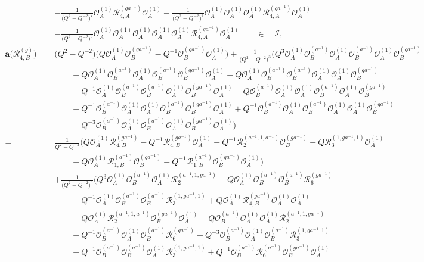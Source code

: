 \documentclass{amsart}
\newcommand{\Oa}{\mathcal O_A}
\newcommand{\Ob}{\mathcal O_B}
\newcommand{\R}{\mathcal R}
\begin{document}
\begin{align*}
=&-\frac1{\big(Q^2-Q^{-2}\big)^2}\Oa^{(1)}\R_{4,A}^{(ga^{-1})}\Oa^{(1)}-\frac1{\big(Q^2-Q^{-2}\big)^4}\Oa^{(1)}\Oa^{(1)}\Oa^{(1)}\R_{4,A}^{(ga^{-1})}\Oa^{(1)}\\
&-\frac1{\big(Q^2-Q^{-2}\big)^6}\Oa^{(1)}\Oa^{(1)}\Oa^{(1)}\Oa^{(1)}\Oa^{(1)}\R_{4,A}^{(ga^{-1})}\Oa^{(1)}\qquad\in\quad\mathcal I,\\[1em]
\mathbf a\big(\R_{4,B}^{(g)}\big)=&\big(Q^2-Q^{-2}\big)\Big(Q\Oa^{(1)}\Ob^{(ga^{-1})}-Q^{-1}\Ob^{(ga^{-1})}\Oa^{(1)}\Big)+\frac1{\big(Q^2-Q^{-2}\big)^3}\Big(Q^3\Oa^{(1)}\Ob^{(a^{-1})}\Oa^{(1)}\Ob^{(a^{-1})}\Oa^{(1)}\Ob^{(ga^{-1})}\\
&\qquad-Q\Oa^{(1)}\Ob^{(a^{-1})}\Oa^{(1)}\Ob^{(a^{-1})}\Ob^{(ga^{-1})}\Oa^{(1)}-Q\Oa^{(1)}\Ob^{(a^{-1})}\Ob^{(a^{-1})}\Oa^{(1)}\Oa^{(1)}\Ob^{(ga^{-1})}\\
&\qquad+Q^{-1}\Oa^{(1)}\Ob^{(a^{-1})}\Ob^{(a^{-1})}\Oa^{(1)}\Ob^{(ga^{-1})}\Oa^{(1)}-Q\Ob^{(a^{-1})}\Oa^{(1)}\Oa^{(1)}\Ob^{(a^{-1})}\Oa^{(1)}\Ob^{(ga^{-1})}\\
&\qquad+Q^{-1}\Ob^{(a^{-1})}\Oa^{(1)}\Oa^{(1)}\Ob^{(a^{-1})}\Ob^{(ga^{-1})}\Oa^{(1)}+Q^{-1}\Ob^{(a^{-1})}\Oa^{(1)}\Ob^{(a^{-1})}\Oa^{(1)}\Oa^{(1)}\Ob^{(ga^{-1})}\\
&\qquad-Q^{-3}\Ob^{(a^{-1})}\Oa^{(1)}\Ob^{(a^{-1})}\Oa^{(1)}\Ob^{(ga^{-1})}\Oa^{(1)}\Big)\\
=&\frac1{Q^2-Q^{-2}}\Big(Q\Oa^{(1)}\R_{4,B}^{(ga^{-1})}-Q^{-1}\R_{4,B}^{(ga^{-1})}\Oa^{(1)}-Q^{-1}\R_{2}^{(a^{-1},1,a^{-1})}\Ob^{(ga^{-1})}-Q\R_{3}^{(1,ga^{-1},1)}\Oa^{(1)}\\
&\qquad+Q\Oa^{(1)}\R_{1,B}^{(a^{-1})}\Ob^{(ga^{-1})}-Q^{-1}\R_{1,B}^{(a^{-1})}\Ob^{(ga^{-1})}\Oa^{(1)}\Big)\\
&+\frac1{\big(Q^2-Q^{-2}\big)^3}\Big(Q^3\Oa^{(1)}\Ob^{(a^{-1})}\Oa^{(1)}\R_{2}^{(a^{-1},1,ga^{-1})}-Q\Oa^{(1)}\Ob^{(a^{-1})}\Ob^{(a^{-1})}\R_{6}^{(ga^{-1})}\\
&\qquad+Q^{-1}\Oa^{(1)}\Ob^{(a^{-1})}\Ob^{(a^{-1})}\R_{3}^{(1,ga^{-1},1)}+Q\Oa^{(1)}\R_{4,B}^{(ga^{-1})}\Oa^{(1)}\Oa^{(1)}\\
&\qquad-Q\Oa^{(1)}\R_{2}^{(a^{-1},1,a^{-1})}\Ob^{(ga^{-1})}\Oa^{(1)}
-Q\Ob^{(a^{-1})}\Oa^{(1)}\Oa^{(1)}\R_{2}^{(a^{-1},1,ga^{-1})}\\
&\qquad+Q^{-1}\Ob^{(a^{-1})}\Oa^{(1)}\Ob^{(a^{-1})}\R_{6}^{(ga^{-1})}-Q^{-3}\Ob^{(a^{-1})}\Oa^{(1)}\Ob^{(a^{-1})}\R_{3}^{(1,ga^{-1},1)}\\
&\qquad-Q^{-1}\Ob^{(a^{-1})}\Ob^{(a^{-1})}\Oa^{(1)}\R_{3}^{(1,ga^{-1},1)}+Q^{-1}\Ob^{(a^{-1})}\R_{6}^{(a^{-1})}\Ob^{(ga^{-1})}\Oa^{(1)}\\

\end{align*}
\end{document}
